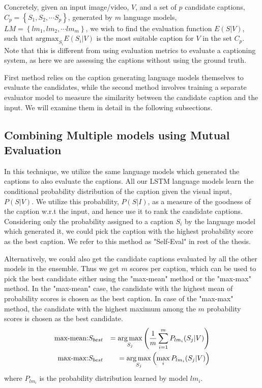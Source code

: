 Concretely, given an input image/video, $V$, and a set of $p$ candidate
captions, $C_p = \left\{S_1,S_2,\cdots S_p \right\}$, generated by $m$ language
models, $LM = \left\{lm_1,lm_2,\cdots lm_m \right\}$, we wish to find the
evaluation function $E(S|V)$, such that $\text{argmax}_{S_i} E(S_i|V)$ is the
most suitable caption for $V$ in the set $C_p$.
Note that this is different from using evaluation metrics to evaluate a
captioning system, as here we are assessing the captions without using the
ground truth. 

First method relies on the caption generating language models themselves to
evaluate the candidates, while the second method involves training a separate
evaluator model to measure the similarity between the candidate caption and the
input.
We will examine them in detail in the following subsections.

\subsection{Combining Multiple models using Mutual Evaluation}

In this technique, we utilize the same language models which generated the
captions to also evaluate the captions.
All our LSTM language models learn the conditional probability distribution of
the caption given the visual input, $P(S|V)$.
We utilize this probability, $P(S|I)$, as a measure of the goodness of the
caption w.r.t the input, and hence use it to rank the candidate captions.
Considering only the probability assigned to a caption $S_i$ by the language
model which generated it, we could pick the caption with the highest probability
score as the best caption.
We refer to this method as "Self-Eval" in rest of the thesis. 


Alternatively, we could also get the candidate captions evaluated by all the
other models in the ensemble.
Thus we get $m$ scores per caption, which can be used to pick the best candidate
either using the "max-mean" method or the "max-max" method.
In the "max-mean" case, the candidate with the highest mean of probability
scores is chosen as the best caption.
In case of the "max-max" method, the candidate with the highest maximum among
the $m$ probability scores is chosen as the best candidate.
\begin{eqnarray}
  \label{eq:cmme} 
  \text{max-mean:}& S_{best} &= \operatorname*{arg\,max}_{S_j}\left(\frac{1}{m}\sum_{i=1}^{m}
  P_{lm_i}(S_j | V)\right)\\
  \text{max-max:}& S_{best} &= \operatorname*{arg\,max}_{S_j} \left(\max_i P_{lm_i}(S_j |
  V)\right)
\end{eqnarray}
\noindent where $P_{lm_i}$ is the probability distribution learned by model
$lm_i$.

